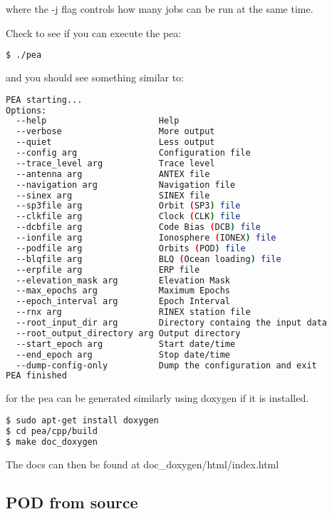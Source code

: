 where the -j flag controls how many jobs can be run at the same time.

Check to see if you can execute the pea:
\begin{lstlisting}[language=bash]
$ ./pea    
\end{lstlisting}

and you should see something similar to:
\begin{lstlisting}[language=bash]
PEA starting...
Options:
  --help                      Help
  --verbose                   More output
  --quiet                     Less output
  --config arg                Configuration file
  --trace_level arg           Trace level
  --antenna arg               ANTEX file
  --navigation arg            Navigation file
  --sinex arg                 SINEX file
  --sp3file arg               Orbit (SP3) file
  --clkfile arg               Clock (CLK) file
  --dcbfile arg               Code Bias (DCB) file
  --ionfile arg               Ionosphere (IONEX) file
  --podfile arg               Orbits (POD) file
  --blqfile arg               BLQ (Ocean loading) file
  --erpfile arg               ERP file
  --elevation_mask arg        Elevation Mask
  --max_epochs arg            Maximum Epochs
  --epoch_interval arg        Epoch Interval
  --rnx arg                   RINEX station file
  --root_input_dir arg        Directory containg the input data
  --root_output_directory arg Output directory
  --start_epoch arg           Start date/time
  --end_epoch arg             Stop date/time
  --dump-config-only          Dump the configuration and exit
PEA finished
\end{lstlisting}

 for the pea can be generated similarly using doxygen if it is installed.

\begin{lstlisting}[language=bash]
$ sudo apt-get install doxygen
$ cd pea/cpp/build
$ make doc_doxygen
\end{lstlisting}
The docs can then be found at doc\_doxygen/html/index.html

\subsection{POD from source}



